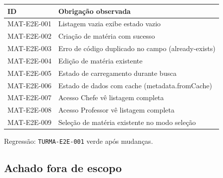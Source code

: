 \small
\begin{longtable}{@{}p{}p{}@{}}
\toprule
ID & Obrigação observada \\
\midrule
\endhead
MAT-E2E-001 & Listagem vazia exibe estado vazio \\
MAT-E2E-002 & Criação de matéria com sucesso \\
MAT-E2E-003 & Erro de código duplicado no campo (already-exists) \\
MAT-E2E-004 & Edição de matéria existente \\
MAT-E2E-005 & Estado de carregamento durante busca \\
MAT-E2E-006 & Estado de dados com cache (metadata.fromCache) \\
MAT-E2E-007 & Acesso Chefe vê listagem completa \\
MAT-E2E-008 & Acesso Professor vê listagem completa \\
MAT-E2E-009 & Seleção de matéria existente no modo seleção \\
\bottomrule
\end{longtable}
\normalsize

Regressão: \texttt{TURMA-E2E-001} verde após mudanças.

\subsection{Achado fora de escopo}

